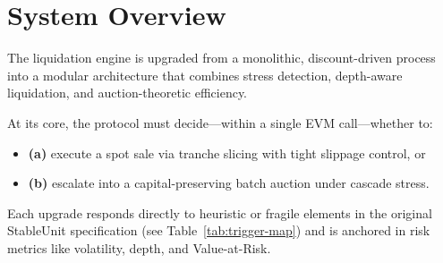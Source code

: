 \documentclass[11pt]{article}
\begin{document}
\section{System Overview}
The liquidation engine is upgraded from a monolithic, discount-driven process into a modular architecture that combines stress detection, depth-aware liquidation, and auction-theoretic efficiency.

At its core, the protocol must decide—within a single EVM call—whether to:
\begin{itemize}
  \item \textbf{(a)} execute a spot sale via tranche slicing with tight slippage control, or
  \item \textbf{(b)} escalate into a capital-preserving batch auction under cascade stress.
\end{itemize}

Each upgrade responds directly to heuristic or fragile elements in the original StableUnit specification (see Table~\ref{tab:trigger-map}) and is anchored in risk metrics like volatility, depth, and Value-at-Risk.
\end{document}
